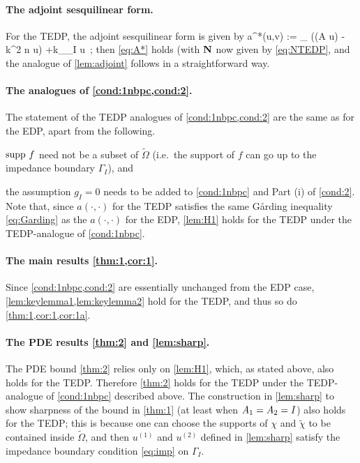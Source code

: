 \paragraph{The adjoint sesquilinear form.} For the TEDP, the adjoint sesquilinear form is given by 
\beq\label{eq:TEDPadjoint}
a^*(u,v) := \int_{\DR} 
\Big((A \grad u)\cdot\grad \vb
 - k^2 n u\vb\Big) +\ri k\int_{\Gamma_I} \gamma u\, ;
\eeq
then \cref{eq:A*} holds (with $\mathbf{N}$ now given by \cref{eq:NTEDP}, and the analogue of \cref{lem:adjoint} follows in a straightforward way.


\paragraph{The analogues of \cref{cond:1nbpc,cond:2}.}
The statement of the TEDP analogues of \cref{cond:1nbpc,cond:2} are the same as for the EDP, apart from the following.
\ben
\item
$\operatorname{supp} \,f$ need not be a subset of $\widetilde{\Omega}$ (i.e.~the support of $f$ can go up to the impedance boundary $\Gamma_I$), and
\item the assumption $g_I= 0$ needs to be added to \cref{cond:1nbpc} and Part (i) of \cref{cond:2}.
\een
 Note that, since $a(\cdot,\cdot)$ for the TEDP satisfies the same G\aa rding inequality \cref{eq:Garding} as the $a(\cdot,\cdot)$ for the EDP, \cref{lem:H1} holds for the TEDP under the TEDP-analogue of \cref{cond:1nbpc}.

\paragraph{The main results \cref{thm:1,cor:1}.}
Since \cref{cond:1nbpc,cond:2} are essentially unchanged from the EDP case, \cref{lem:keylemma1,lem:keylemma2} hold for the TEDP, and thus so do \cref{thm:1,cor:1,cor:1a}.

\paragraph{The PDE results \cref{thm:2} and \cref{lem:sharp}.}

The PDE bound \cref{thm:2} relies only on \cref{lem:H1}, which, as stated above, also holds for the TEDP. Therefore \cref{thm:2} holds for the TEDP under the TEDP-analogue of \cref{cond:1nbpc} described above. The construction in \cref{lem:sharp} to show sharpness of the bound in \cref{thm:1} (at least when $A_{1}= A_{2}= I$) also holds for the TEDP; this is because one can choose the supports of $\chi$ and $\widetilde{\chi}$ to be contained inside $\widetilde{\Omega}$, and then $u^{(1)}$ and $u^{(2)}$ defined in \cref{lem:sharp} satisfy the impedance boundary condition \cref{eq:imp} on $\Gamma_I$.

